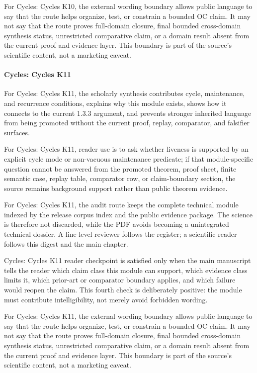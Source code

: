 For Cycles: Cycles K10, the external wording boundary allows public language to say that the route helps organize, test, or constrain a bounded OC claim. It may not say that the route proves full-domain closure, final bounded cross-domain synthesis status, unrestricted comparative claim, or a domain result absent from the current proof and evidence layer. This boundary is part of the source's scientific content, not a marketing caveat.


\paragraph{Cycles: Cycles K11}

For Cycles: Cycles K11, the scholarly synthesis contributes cycle, maintenance, and recurrence conditions, explains why this module exists, shows how it connects to the current 1.3.3 argument, and prevents stronger inherited language from being promoted without the current proof, replay, comparator, and falsifier surfaces.


For Cycles: Cycles K11, reader use is to ask whether liveness is supported by an explicit cycle mode or non-vacuous maintenance predicate; if that module-specific question cannot be answered from the promoted theorem, proof sheet, finite semantic case, replay table, comparator row, or claim-boundary section, the source remains background support rather than public theorem evidence.


For Cycles: Cycles K11, the audit route keeps the complete technical module indexed by the release corpus index and the public evidence package. The science is therefore not discarded, while the PDF avoids becoming a unintegrated technical dossier. A line-level reviewer follows the register; a scientific reader follows this digest and the main chapter.


Cycles: Cycles K11 reader checkpoint is satisfied only when the main manuscript tells the reader which claim class this module can support, which evidence class limits it, which prior-art or comparator boundary applies, and which failure would reopen the claim. This fourth check is deliberately positive: the module must contribute intelligibility, not merely avoid forbidden wording.


For Cycles: Cycles K11, the external wording boundary allows public language to say that the route helps organize, test, or constrain a bounded OC claim. It may not say that the route proves full-domain closure, final bounded cross-domain synthesis status, unrestricted comparative claim, or a domain result absent from the current proof and evidence layer. This boundary is part of the source's scientific content, not a marketing caveat.


